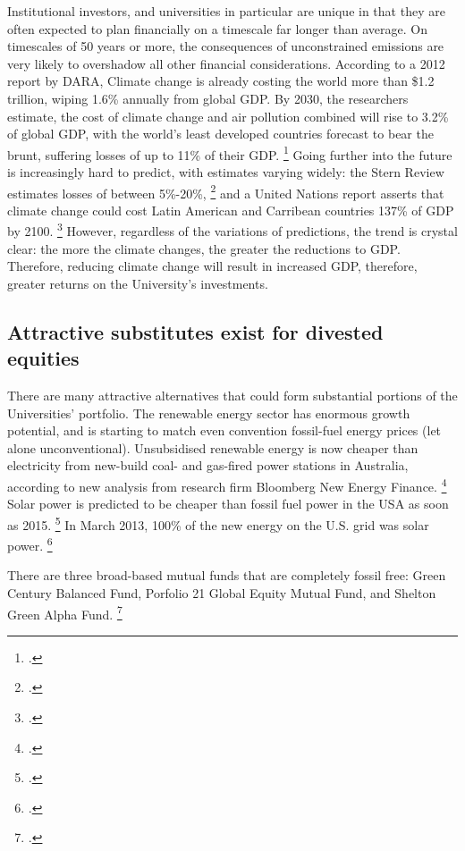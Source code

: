 Institutional investors, and universities in particular are unique in that they are often expected to plan financially on a timescale far longer than average. 
On timescales of 50 years or more, the consequences of unconstrained emissions are very likely to overshadow all other financial considerations.
According to a 2012 report by DARA, Climate change is already costing the world more than \$1.2 trillion, wiping 1.6\% annually from global GDP.
By 2030, the researchers estimate, the cost of climate change and air pollution combined will rise to 3.2\% of global GDP, with the world's least developed countries forecast to bear the brunt, suffering losses of up to 11\% of their GDP. \footcite{DARACVM}
Going further into the future is increasingly hard to predict, with estimates varying widely: the Stern Review estimates losses of between 5\%-20\%, \footcite{Stern2007} and a United Nations report asserts that climate change could cost Latin American and Carribean countries 137\% of GDP by 2100. \footcite{CCLatinAmerica}
However, regardless of the variations of predictions, the trend is crystal clear: the more the climate changes, the greater the reductions to GDP.
Therefore, reducing climate change will result in increased GDP, therefore, greater returns on the University's investments.





\subsection {Attractive substitutes exist for divested equities}

There are many attractive alternatives that could form substantial portions of the Universities' portfolio.
The renewable energy sector has enormous growth potential, and is starting to match even convention fossil-fuel energy prices (let alone unconventional).
Unsubsidised renewable energy is now cheaper than electricity from new-build coal- and gas-fired power stations in Australia, according to new analysis from research firm Bloomberg New Energy Finance. \footcite{BlombergAussieWind}
Solar power is predicted to be cheaper than fossil fuel power in the USA as soon as 2015. \footcite{GlobalDataSolar}
In March 2013, 100\% of the new energy on the U.S. grid was solar power. \footcite{SmartPlanetSolar100}

There are three broad-based mutual funds that are completely fossil free: Green Century Balanced Fund, Porfolio 21 Global Equity Mutual Fund, and Shelton Green Alpha Fund. \footcite{GFFMyMoney}



